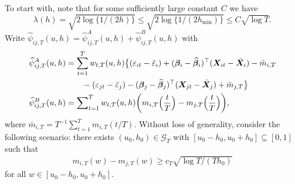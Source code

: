 To start with, note that for some sufficiently large constant $C$ we have
\begin{equation}\label{eqA:power:lambda}
\lambda(h) = \sqrt{2\log\{1/(2h)\}} \le \sqrt{2\log\{1/(2h_{\min})\}} \le C \sqrt{\log T}.
\end{equation}
Write $\widehat{\psi}_{ij, T}(u,h) = \widehat{\psi}_{ij, T}^A(u,h) + \widehat{\psi}_{ij, T}^B(u,h)$ with 
\begin{align*}
\widehat{\psi}^A_{ij,T}(u,h) &= \sum_{t=1}^T w_{t,T}(u,h) \big\{ (\varepsilon_{it} - \bar{\varepsilon}_i) + (\bm{\beta}_i - \widehat{\bm{\beta}}_i)^\top (\boldsymbol{X}_{it} - \bar{\boldsymbol{X}}_{i}) - \bar{m}_{i, T} \\
& \quad \quad - (\varepsilon_{jt} - \bar{\varepsilon}_j) -  (\bm{\beta}_j - \widehat{\bm{\beta}}_j)^\top (\boldsymbol{X}_{jt} - \bar{\boldsymbol{X}}_{j}) + \bar{m}_{j, T} \big\} \\
\widehat{\psi}_{ij, T}^B(u,h) &= \sum\nolimits_{t=1}^T w_{t,T}(u,h) \bigg(m_{i, T}\Big(\frac{t}{T}\Big) - m_{j, T}\Big(\frac{t}{T}\Big) \bigg),
\end{align*}
where $\bar{m}_{i, T} = T^{-1} \sum_{t=1}^T m_{i, T} (t/T)$. Without loss of generality, consider the following scenario: there exists $(u_0,h_0) \in \mathcal{G}_T$ with $[u_0-h_0,u_0+h_0] \subseteq [0,1]$ such that \begin{align}\label{eqA:power2}
m_{i,T}(w) - m_{j,T}(w) \ge c_T \sqrt{\log T/(Th_0)}
\end{align}
for all $w \in [u_0-h_0,u_0+h_0]$. 


